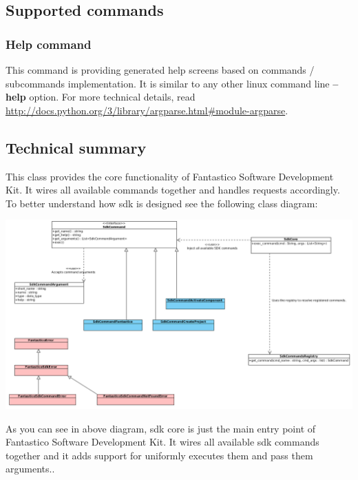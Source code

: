 \documentclass[letterpaper,10pt,english]{sphinxmanual}
\begin{document}
\subsection{Supported commands}
\label{features/sdk:supported-commands}

\subsubsection{Help command}
\label{features/sdk/command_help::doc}\label{features/sdk/command_help:help-command}
This command is providing generated help screens based on commands / subcommands implementation. It is similar to any other
linux command line \textbf{--help} option. For more technical details, read \href{http://docs.python.org/3/library/argparse.html\#module-argparse}{http://docs.python.org/3/library/argparse.html\#module-argparse}.


\subsection{Technical summary}
\label{features/sdk:technical-summary}

\begin{fulllineitems}
\label{features/sdk:fantastico.sdk.sdk_core.SdkCore}
This class provides the core functionality of Fantastico Software Development Kit. It
wires all available commands together and handles requests accordingly.
To better understand how sdk is designed see the following class diagram:

\includegraphics{design.png}

As you can see in above diagram, sdk core is just the main entry point of Fantastico Software Development Kit. It wires
all available sdk commands together and it adds support for uniformly executes them and pass them arguments..

\end{fulllineitems}
\end{document}
